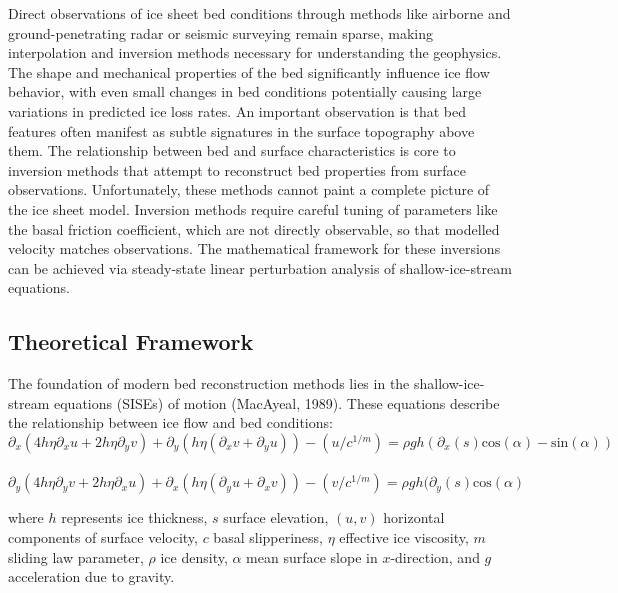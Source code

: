 Direct observations of ice sheet bed conditions through methods like airborne and ground-penetrating radar or seismic surveying remain sparse, making interpolation and inversion methods necessary for understanding the geophysics. The shape and mechanical properties of the bed significantly influence ice flow behavior, with even small changes in bed conditions potentially causing large variations in predicted ice loss rates. An important observation is that bed features often manifest as subtle signatures in the surface topography above them\cite{Ockenden_2022}.
The relationship between bed and surface characteristics is core to inversion methods that attempt to reconstruct bed properties from surface observations. Unfortunately, these methods cannot paint a complete picture of the ice sheet model. Inversion methods require careful tuning of parameters like the basal friction coefficient, which are not directly observable, so that modelled velocity matches observations. The mathematical framework for these inversions can be achieved via steady-state linear perturbation analysis of shallow-ice-stream equations\cite{Gudmundsson_2008}.

\subsection*{Theoretical Framework}

The foundation of modern bed reconstruction methods lies in the shallow-ice-stream equations (SISEs) of motion (MacAyeal, 1989). These equations describe the relationship between ice flow and bed conditions:
\begin{equation}\partial_{x} (4 h \eta \partial_{x} u + 2 h \eta \partial_y v) + \partial_{y}(h \eta( \partial_{x} v + \partial_{y} u)) - (u/c^{1/m}) = \rho g h ( \partial_{x} (s) \mathrm{cos}(\alpha) - \mathrm{sin}(\alpha))
\end{equation}\\
\begin{equation}\partial_{y} (4 h \eta \partial_{y} v + 2 h \eta \partial_x u) + \partial_{x}(h \eta( \partial_{y} u + \partial_{x} v)) - (v/c^{1/m}) = \rho g h ( \partial_{y} (s) \mathrm{cos}(\alpha)
\end{equation}

where $h$ represents ice thickness, $s$ surface elevation, $(u, v)$ horizontal components of surface velocity, $c$ basal slipperiness, $\eta$ effective ice viscosity, $m$ sliding law parameter, $\rho$ ice density, $\alpha$ mean surface slope in $x$-direction, and $g$ acceleration due to gravity.

